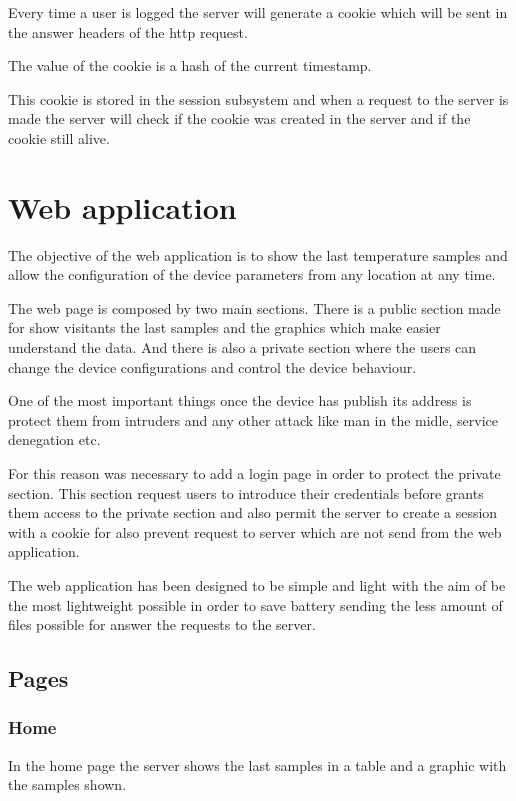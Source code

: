 		Every time a user is logged the server will generate a cookie which will be sent in the answer headers of the http request.

		The value of the cookie is a hash of the current timestamp.

		This cookie is stored in the session subsystem and when a request to the server is made the server will check if the cookie was created in the server and if the cookie still alive.

	\section{Web application}
	The objective of the web application is to show the last temperature samples and allow the configuration of the device parameters from any location at any time.

	The web page is composed by two main sections. There is a public section made for show visitants the last samples and the graphics which make easier understand the data. And there is also a private section where the users can change the device configurations and control the device behaviour.

	One of the most important things once the device has publish its address is protect them from intruders and any other attack like man in the midle, service denegation etc.

	For this reason was necessary to add a login page in order to protect the private section. This section request users to introduce their credentials before grants them access to the private section and also permit the server to create a session with a cookie for also prevent request to server which are not send from the web application.

	The web application has been designed to be simple and light with the aim of be the most lightweight possible in order to save battery sending the less amount of files possible for answer the requests to the server.

		\subsection{Pages} %
		\subsubsection{Home}
		In the home page the server shows the last samples in a table and a graphic with the samples shown.

